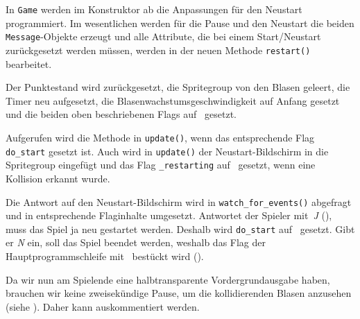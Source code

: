 

In \texttt{Game} werden im Konstruktor ab  die Anpassungen für den Neustart programmiert. Im wesentlichen werden für die Pause und den Neustart die beiden \texttt{Message}-Objekte erzeugt und alle Attribute, die bei einem Start/Neustart zurückgesetzt werden müssen, werden in der neuen Methode \texttt{restart()} bearbeitet.


Der Punktestand wird zurückgesetzt, die Spritegroup von den Blasen geleert, die Timer neu aufgesetzt, die Blasenwachstumsgeschwindigkeit auf Anfang gesetzt und die beiden oben beschriebenen Flags auf \false\ gesetzt.



Aufgerufen wird die Methode in \texttt{update()}, wenn das entsprechende Flag \texttt{do\_start} gesetzt ist. Auch wird in \texttt{update()} der Neustart-Bildschirm in die Spritegroup eingefügt und das Flag \texttt{\_restarting} auf \true\ gesetzt, wenn eine Kollision erkannt wurde. 



Die Antwort auf den Neustart-Bildschirm wird in \texttt{watch\_for\_events()} abgefragt und in entsprechende Flaginhalte umgesetzt. Antwortet der Spieler mit~\emph{J} (), muss das Spiel ja neu gestartet werden. Deshalb wird \texttt{do\_start} auf \true\ gesetzt. Gibt er \emph{N} ein, soll das Spiel beendet werden, weshalb das Flag der Hauptprogrammschleife mit \false\ bestückt wird ().


Da wir nun am Spielende eine halbtransparente Vordergrundausgabe haben, brauchen wir keine zweisekündige Pause, um die kollidierenden Blasen anzusehen (siehe ). Daher kann  auskommentiert werden.

